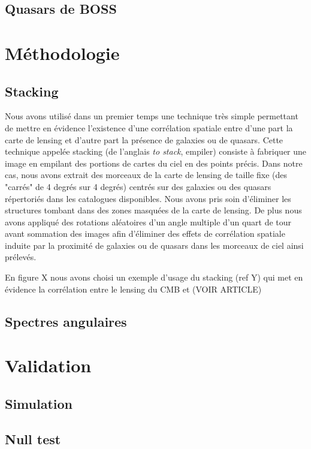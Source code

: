 \subsection{Quasars de BOSS}

\section{Méthodologie}
\subsection{Stacking}

Nous avons utilisé dans un premier temps une technique très simple permettant de mettre en évidence l'existence d'une corrélation spatiale entre d'une part la carte de lensing et d'autre part la présence de galaxies ou de quasars. Cette technique appelée stacking (de l'anglais \textit{to stack}, empiler) consiste à fabriquer une image en empilant des portions de cartes du ciel en des points précis. Dans notre cas, nous avons extrait des morceaux de la carte de lensing de taille fixe (des "carrés" de 4 degrés sur 4 degrés) centrés sur des galaxies ou des quasars répertoriés dans les catalogues disponibles. Nous avons pris soin d'éliminer les structures tombant dans des zones masquées de la carte de lensing. De plus nous avons appliqué des rotations aléatoires d'un angle multiple d'un quart de tour avant sommation des images afin d'éliminer des effets de corrélation spatiale induite par la proximité de galaxies ou de quasars dans les morceaux de ciel ainsi prélevés.

En figure X nous avons choisi un exemple d'usage du stacking (ref Y) qui met en évidence la corrélation entre le lensing du CMB et (VOIR ARTICLE)


\subsection{Spectres angulaires}

\section{Validation}
\subsection{Simulation}
\subsection{Null test}

